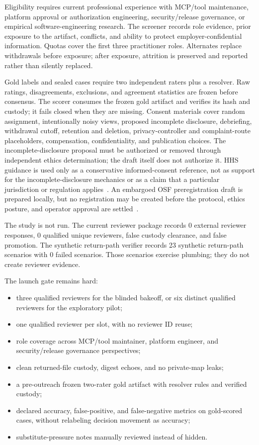 \documentclass[11pt,letterpaper]{article}
\begin{document}
Eligibility requires current professional experience with MCP/tool maintenance, platform approval or authorization engineering, security/release governance, or empirical software-engineering research. The screener records role evidence, prior exposure to the artifact, conflicts, and ability to protect employer-confidential information. Quotas cover the first three practitioner roles. Alternates replace withdrawals before exposure; after exposure, attrition is preserved and reported rather than silently replaced.

Gold labels and sealed cases require two independent raters plus a resolver. Raw ratings, disagreements, exclusions, and agreement statistics are frozen before consensus. The scorer consumes the frozen gold artifact and verifies its hash and custody; it fails closed when they are missing. Consent materials cover random assignment, intentionally noisy views, proposed incomplete disclosure, debriefing, withdrawal cutoff, retention and deletion, privacy-controller and complaint-route placeholders, compensation, confidentiality, and publication choices. The incomplete-disclosure proposal must be authorized or removed through independent ethics determination; the draft itself does not authorize it. HHS guidance is used only as a conservative informed-consent reference, not as support for the incomplete-disclosure mechanics or as a claim that a particular jurisdiction or regulation applies~\cite{hhs-consent}. An embargoed OSF preregistration draft is prepared locally, but no registration may be created before the protocol, ethics posture, and operator approval are settled~\cite{osf-registration}.

The study is not run. The current reviewer package records 0 external reviewer responses, 0 qualified unique reviewers, false custody clearance, and false promotion. The synthetic return-path verifier records 23 synthetic return-path scenarios with 0 failed scenarios. Those scenarios exercise plumbing; they do not create reviewer evidence.

The launch gate remains hard:

\begin{itemize}
    \item three qualified reviewers for the blinded bakeoff, or six distinct qualified reviewers for the exploratory pilot;
    \item one qualified reviewer per slot, with no reviewer ID reuse;
    \item role coverage across MCP/tool maintainer, platform engineer, and security/release governance perspectives;
    \item clean returned-file custody, digest echoes, and no private-map leaks;
    \item a pre-outreach frozen two-rater gold artifact with resolver rules and verified custody;
    \item declared accuracy, false-positive, and false-negative metrics on gold-scored cases, without relabeling decision movement as accuracy;
    \item substitute-pressure notes manually reviewed instead of hidden.
\end{itemize}
\end{document}
